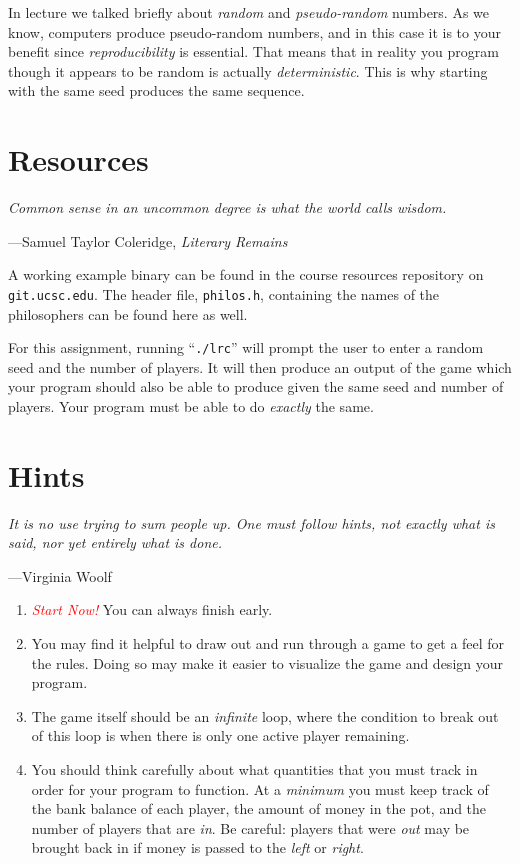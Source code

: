 \documentclass{article}
\begin{document}
In lecture we talked briefly about \emph{random} and \emph{pseudo-random}
numbers. As we know, computers produce pseudo-random numbers,
and in this case it is to your benefit since \emph{reproducibility}
is essential. That means that in reality you program though it
appears to be random is actually \emph{deterministic}. This is why
starting with the same seed produces the same sequence.

\section{Resources}
\epigraph{\emph{Common sense in an uncommon degree is what the
world calls wisdom.}}{---Samuel Taylor Coleridge, \emph{Literary Remains}}\noindent

A working example binary can be found in the course resources repository
on \texttt{git.ucsc.edu}. The header file, \texttt{philos.h}, containing
the names of the philosophers can be found here as well.

For this assignment, running ``\texttt{./lrc}'' will prompt the user to
enter a random seed and the number of players. It will then produce an
output of the game which your program should also be able to produce
given the same seed and number of players. Your program must be able to
do \textit{exactly} the same.

\section{Hints}
\epigraph{\emph{It is no use trying to sum people up. One must follow hints,
not exactly what is said, nor yet entirely what is done.}}{---Virginia Woolf}\noindent

\begin{enumerate}

\item \emph{\textcolor{red}{Start Now!}} You can always finish early.

\item You may find it helpful to draw out and run through a game to get a feel
    for the rules. Doing so may make it easier to visualize the game and design
    your program.
\item The game itself should be an \textit{infinite} loop, where the condition to break
    out of this loop is when there is only one active player remaining.
\item You should think carefully about what quantities that you
must track in order for your program to function. At a \emph{minimum}
you must keep track of the bank balance of each player, the amount
of money in the pot, and the number of players that are \emph{in}.
Be careful: players that were \emph{out} may be brought back in if
money is passed to the \emph{left} or \emph{right}.

\end{enumerate}
\end{document}
